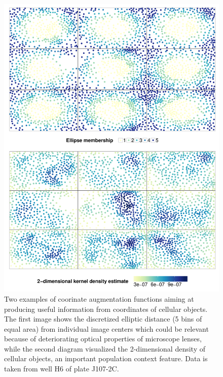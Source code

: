 \begin{knitrout}
\color{fgcolor}\begin{figure}

{\centering \includegraphics[width=.8\linewidth]{figures/R/augmentationFeatures-scf-augFeat_plot-1} 

}

\caption[Examples of coordinate augmentation functions as implemented in singleCellFeatures.]{Two examples of coorinate augmentation functions aiming at producing useful information from coordinates of cellular objects. The first image shows the discretized elliptic distance (5 bins of equal area) from individual image centers which could be relevant because of deteriorating optical properties of microscope lenses, while the second diagram visualized the 2-dimensional density of cellular objects, an important population context feature. Data is taken from well H6 of plate J107-2C.}\label{fig:scf-augFeat_plot}
\end{figure}


\end{knitrout}
